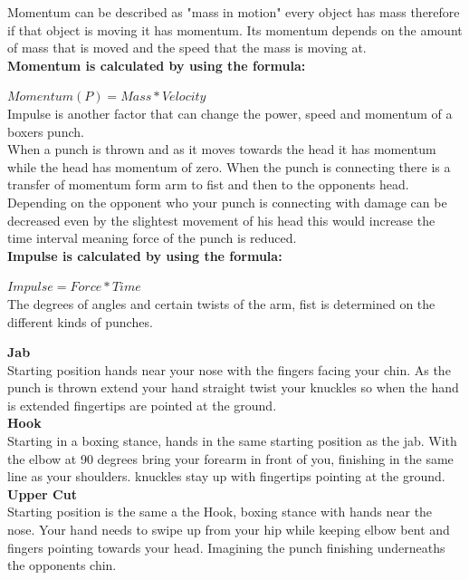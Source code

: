 \documentclass[a4paper,12pt]{report}
\begin{document}
Momentum can be described as "mass in motion" every object has mass therefore if that object is moving it has momentum. Its momentum depends on the amount of mass that is moved and the speed that the mass is moving at.\\

\textbf{Momentum is calculated by using the formula:}

$Momentum (P) = Mass * Velocity$\\

Impulse is another factor that can change the power, speed and momentum of a boxers punch. \\
When a punch is thrown and as it moves towards the head it has momentum while the head has momentum of zero.
When the punch is connecting there is a transfer of momentum form arm to fist and then to the opponents head. \\
Depending on the opponent who your punch is connecting with damage can be decreased even by the slightest movement of his head this would increase the time interval meaning force of the punch is reduced. \\

\textbf{Impulse is calculated by using the formula:}

$Impulse = Force * Time$ \cite{boxingPhysics}\\

The degrees of angles and certain twists of the arm, fist is determined on the different kinds of punches.

\textbf{Jab}\\
Starting position hands near your nose with the fingers facing your chin.
As the punch is thrown extend your hand straight twist your knuckles so when the hand is extended fingertips are pointed at the ground.\\

\textbf{Hook}\\
Starting in a boxing stance, hands in the same starting position as the jab.
With the elbow at 90 degrees bring your forearm in front of you, finishing in the same line as your shoulders. 
knuckles stay up with fingertips pointing at the ground.\\

\textbf{Upper Cut}\\
Starting position is the same a the Hook, boxing stance with hands near the nose. 
Your hand needs to swipe up from your hip while keeping elbow bent and fingers pointing towards your head. Imagining the punch finishing underneaths the opponents chin.\cite{punchingPhysics}
\end{document}
